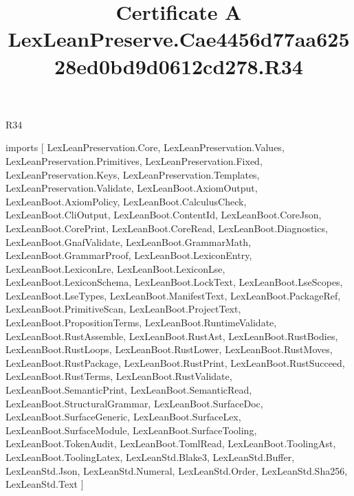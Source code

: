 \begin{lexlean}{R34}
\title{Certificate A LexLeanPreserve.Cae4456d77aa62528ed0bd9d0612cd278.R34}
\begin{coremodule}
imports [
  LexLeanPreservation.Core,
  LexLeanPreservation.Values,
  LexLeanPreservation.Primitives,
  LexLeanPreservation.Fixed,
  LexLeanPreservation.Keys,
  LexLeanPreservation.Templates,
  LexLeanPreservation.Validate,
  LexLeanBoot.AxiomOutput,
  LexLeanBoot.AxiomPolicy,
  LexLeanBoot.CalculusCheck,
  LexLeanBoot.CliOutput,
  LexLeanBoot.ContentId,
  LexLeanBoot.CoreJson,
  LexLeanBoot.CorePrint,
  LexLeanBoot.CoreRead,
  LexLeanBoot.Diagnostics,
  LexLeanBoot.GnafValidate,
  LexLeanBoot.GrammarMath,
  LexLeanBoot.GrammarProof,
  LexLeanBoot.LexiconEntry,
  LexLeanBoot.LexiconLre,
  LexLeanBoot.LexiconLse,
  LexLeanBoot.LexiconSchema,
  LexLeanBoot.LockText,
  LexLeanBoot.LseScopes,
  LexLeanBoot.LseTypes,
  LexLeanBoot.ManifestText,
  LexLeanBoot.PackageRef,
  LexLeanBoot.PrimitiveScan,
  LexLeanBoot.ProjectText,
  LexLeanBoot.PropositionTerms,
  LexLeanBoot.RuntimeValidate,
  LexLeanBoot.RustAssemble,
  LexLeanBoot.RustAst,
  LexLeanBoot.RustBodies,
  LexLeanBoot.RustLoops,
  LexLeanBoot.RustLower,
  LexLeanBoot.RustMoves,
  LexLeanBoot.RustPackage,
  LexLeanBoot.RustPrint,
  LexLeanBoot.RustSucceed,
  LexLeanBoot.RustTerms,
  LexLeanBoot.RustValidate,
  LexLeanBoot.SemanticPrint,
  LexLeanBoot.SemanticRead,
  LexLeanBoot.StructuralGrammar,
  LexLeanBoot.SurfaceDoc,
  LexLeanBoot.SurfaceGeneric,
  LexLeanBoot.SurfaceLex,
  LexLeanBoot.SurfaceModule,
  LexLeanBoot.SurfaceTooling,
  LexLeanBoot.TokenAudit,
  LexLeanBoot.TomlRead,
  LexLeanBoot.ToolingAst,
  LexLeanBoot.ToolingLatex,
  LexLeanStd.Blake3,
  LexLeanStd.Buffer,
  LexLeanStd.Json,
  LexLeanStd.Numeral,
  LexLeanStd.Order,
  LexLeanStd.Sha256,
  LexLeanStd.Text
]


\end{coremodule}
\end{lexlean}
